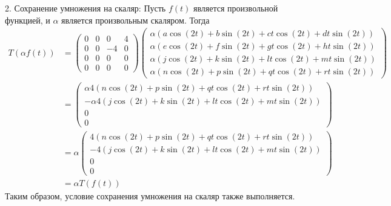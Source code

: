 \documentclass{article}
\begin{document}
2. Сохранение умножения на скаляр:
   Пусть $f(t)$ является произвольной функцией, и $\alpha$ является произвольным скаляром. Тогда
   \begin{align*}
   T(\alpha f(t)) &= \begin{pmatrix} 0 & 0 & 0 & 4 \\ 0 & 0 & -4 & 0 \\ 0 & 0 & 0 & 0 \\ 0 & 0 & 0 & 0 \end{pmatrix} 
   \begin{pmatrix}\alpha(a\cos(2t) + b\sin(2t) + ct\cos(2t) + dt\sin(2t)) \\ \alpha(e\cos(2t) + f\sin(2t) + gt\cos(2t) + ht\sin(2t)) \\ \alpha(j\cos(2t) + k\sin(2t) + lt\cos(2t) + mt\sin(2t)) \\ \alpha(n\cos(2t) + p\sin(2t) + qt\cos(2t) + rt\sin(2t)) \end{pmatrix} \\
   &= \begin{pmatrix}\alpha4(n\cos(2t) + p\sin(2t) + qt\cos(2t) + rt\sin(2t)) \\ -\alpha4(j\cos(2t) + k\sin(2t) + lt\cos(2t) + mt\sin(2t)) \\ 0 \\ 0 \end{pmatrix} \\
   &= \alpha \begin{pmatrix}4(n\cos(2t) + p\sin(2t) + qt\cos(2t) + rt\sin(2t)) \\ -4(j\cos(2t) + k\sin(2t) + lt\cos(2t) + mt\sin(2t)) \\ 0 \\ 0 \end{pmatrix} \\
   &= \alpha T(f(t))
   \end{align*}
   Таким образом, условие сохранения умножения на скаляр также выполняется.
\end{document}
